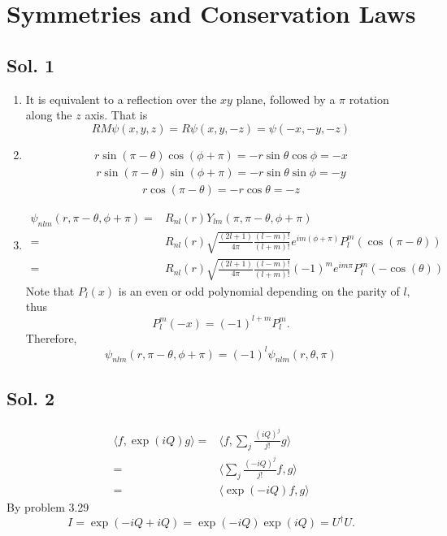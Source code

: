 \section{Symmetries and Conservation Laws}
\subsection*{Sol. 1}
\begin{enumerate}
    \item It is equivalent to a reflection over the $xy$ plane, followed by a $\pi$ rotation along the $z$ axis.
     That is 
     $$
     RM\psi(x,y,z) = R\psi(x,y,-z) = \psi(-x,-y,-z)
     $$
     \item 
     \begin{align*}
         r\sin(\pi-\theta)\cos(\phi+\pi)
         =-r\sin\theta\cos\phi=-x
     \end{align*}
     \begin{align*}
         r\sin(\pi-\theta)\sin(\phi+\pi)
         =-r\sin\theta\sin\phi=-y
     \end{align*}
     \begin{align*}
         r\cos(\pi-\theta)
         =-r\cos\theta=-z
     \end{align*}
     \item 
     \begin{align*}
         \psi_{nlm}(r,\pi-\theta,\phi+\pi)
         =&R_{nl}(r)Y_{lm}(\pi,\pi-\theta, \phi+\pi)\\
         =&R_{nl}(r)\sqrt{\frac{(2l+1)}{4\pi}\frac{(l-m)!}{(l+m)!}}e^{im(\phi+\pi)}
         P^m_l(\cos(\pi-\theta))\\
         =&R_{nl}(r)\sqrt{\frac{(2l+1)}{4\pi}\frac{(l-m)!}{(l+m)!}}
         (-1)^me^{im\pi}
         P^m_l(-\cos(\theta))
     \end{align*}
     Note that $P_l(x)$ is an even or odd polynomial depending on the parity of $l,$ thus 
     $$
     P^m_l(-x) = (-1)^{l+m}P^m_l.
     $$
     Therefore,
     $$
     \psi_{nlm}(r,\pi-\theta,\phi+\pi) = (-1)^l\psi_{nlm}(r,\theta,\pi)
     $$
\end{enumerate}

\subsection*{Sol. 2}
\begin{align*}
    \langle f, \exp(iQ)g\rangle = &
    \langle f, \sum_j\frac{(iQ)^j}{j!}g\rangle\\
    =&\langle \sum_j\frac{(-iQ)^j}{j!}f, g\rangle\\
    =&\langle \exp(-iQ)f, g\rangle
\end{align*}
By problem 3.29
$$
I = \exp(-iQ+iQ)=\exp(-iQ)\exp(iQ)=U^\dagger U.
$$


